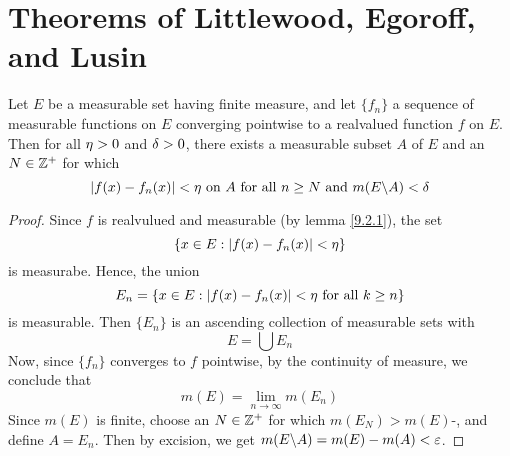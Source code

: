 \section{Theorems of Littlewood, Egoroff, and Lusin}

\begin{lemma}\label{9.3.1}
    Let $E$ be a measurable set having finite measure, and let  $\{f_n\}$ a
    sequence of measurable functions on $E$ converging pointwise to a realvalued
    function  $f$ on  $E$. Then for all  $\eta>0$ and  $\delta>0$, there exists a
    measurable subset  $A$ of $E$ and an  $N \in \mathbb{Z}^+$ for which
    \begin{equation*}
        |f(x)-f_n(x)|<\eta \text{ on } A \text{ for all } n \geq N \text{ and }
        m(E \backslash A)<\delta
    \end{equation*}
\end{lemma}
\begin{proof}
    Since $f$ is realvulued and measurable (by lemma \ref{9.2.1}), the set
    \begin{equation*}
        \{x \in E : |f(x)-f_n(x)|<\eta\}
    \end{equation*}
    is measurabe. Hence, the union
    \begin{equation*}
        E_n=\{x \in E : |f(x)-f_n(x)|<\eta \text{ for all } k \geq n\}
    \end{equation*}
    is measurable. Then $\{E_n\}$ is an ascending collection of measurable sets
    with
    \begin{equation*}
        E=\bigcup{E_n}
    \end{equation*}
    Now, since  $\{f_n\}$ converges to $f$ pointwise, by the continuity of
    measure, we conclude that
    \begin{equation*}
        m(E)=\lim_{n \xrightarrow{} \infty}{m(E_n)}
    \end{equation*}
    Since $m(E)$ is finite, choose an $N \in \mathbb{Z}^+$ for which  $m(E_N)>m(E)$-\e,
    and define $A=E_n$. Then by excision, we get  $m(E \backslash A)=m(E)-m(A)<\varepsilon$.
\end{proof}


